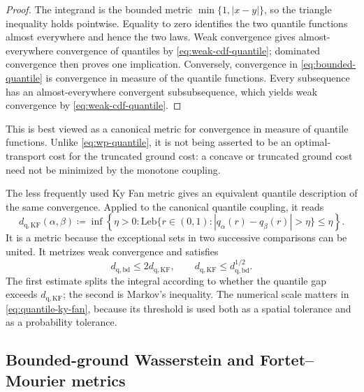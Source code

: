 \documentclass[11pt]{article}
\newcommand{\al}{\alpha}
\newcommand{\be}{\beta}
\newcommand{\eqdef}{\coloneqq}
\begin{document}
\begin{proof}
The integrand is the bounded metric $\min\{1,|x-y|\}$, so the triangle
inequality holds pointwise.  Equality to zero identifies the two quantile
functions almost everywhere and hence the two laws.  Weak convergence gives
almost-everywhere convergence of quantiles by
\eqref{eq:weak-cdf-quantile}; dominated convergence then proves one
implication.  Conversely, convergence in \eqref{eq:bounded-quantile} is
convergence in measure of the quantile functions.  Every subsequence has an
almost-everywhere convergent subsubsequence, which yields weak convergence by
\eqref{eq:weak-cdf-quantile}.
\end{proof}

This is best viewed as a canonical metric for convergence in measure of
quantile functions.  Unlike \eqref{eq:wp-quantile}, it is not being asserted
to be an optimal-transport cost for the truncated ground cost: a concave or
truncated ground cost need not be minimized by the monotone coupling.

The less frequently used Ky Fan metric gives an equivalent quantile
description of the same convergence.  Applied to the canonical quantile
coupling, it reads~\cite{Billingsley1999}
\begin{equation}\label{eq:quantile-ky-fan}
 d_{\mathrm{q,KF}}(\al,\be)
 \eqdef\inf\left\{\eta>0:
 \mathrm{Leb}\bigl\{r\in(0,1):|q_\al(r)-q_\be(r)|>\eta\bigr\}
 \leq\eta\right\}.
\end{equation}
It is a metric because the exceptional sets in two successive comparisons
can be united.  It metrizes weak convergence and satisfies
\begin{equation}\label{eq:bounded-quantile-ky-fan}
 d_{\mathrm{q,bd}}\leq2d_{\mathrm{q,KF}},
 \qquad
 d_{\mathrm{q,KF}}\leq d_{\mathrm{q,bd}}^{1/2}.
\end{equation}
The first estimate splits the integral according to whether the quantile
gap exceeds $d_{\mathrm{q,KF}}$; the second is Markov's inequality.  The
numerical scale matters in \eqref{eq:quantile-ky-fan}, because its threshold
is used both as a spatial tolerance and as a probability tolerance.

\subsection{Bounded-ground Wasserstein and Fortet--Mourier metrics}
\end{document}
